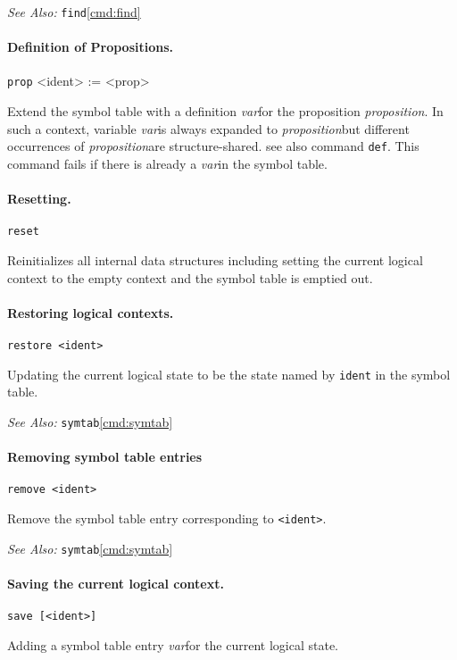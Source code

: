 \documentclass[12pt]{article}
\newcommand{\var}{\textit{var}}
\newcommand{\prop}{\textit{proposition}}
\begin{document}
\noindent
{\em See Also:} \texttt{find}\ref{cmd:find} 


\paragraph{Definition of Propositions.}\label{cmd:prop}
  \begin{center}
  \texttt{prop} <ident> := <prop>
  \end{center}
Extend the symbol table with a definition \var for the proposition \prop\@.
In such a context, variable \var is always expanded to \prop but
different occurrences of \prop are structure-shared. see also command \texttt{def}\@.
This command fails if there is already a \var in the symbol table.


\paragraph{Resetting.}\label{cmd:reset}
  \begin{center}
  \texttt{reset}
  \end{center}
Reinitializes all internal data structures including setting the current logical 
context to the empty context and the symbol table is emptied out.


\paragraph{Restoring logical contexts.}\label{cmd:restore}
  \begin{center}
  \texttt{restore <ident>}
  \end{center}
Updating the current logical state to be the state
named by \texttt{ident} in the symbol table.

\noindent
{\em See Also:}  \texttt{symtab}\ref{cmd:symtab}


\paragraph{Removing symbol table entries}\label{cmd:remove}
  \begin{center}
  \texttt{remove <ident>}
  \end{center}
Remove the symbol table entry corresponding to \texttt{<ident>}\@.

\noindent
{\em See Also:}  \texttt{symtab}\ref{cmd:symtab}



\paragraph{Saving the current logical context.}\label{cmd:save}
  \begin{center}
  \texttt{save [<ident>]}
  \end{center}
Adding a symbol table entry \var for the current 
logical state.
\end{document}
